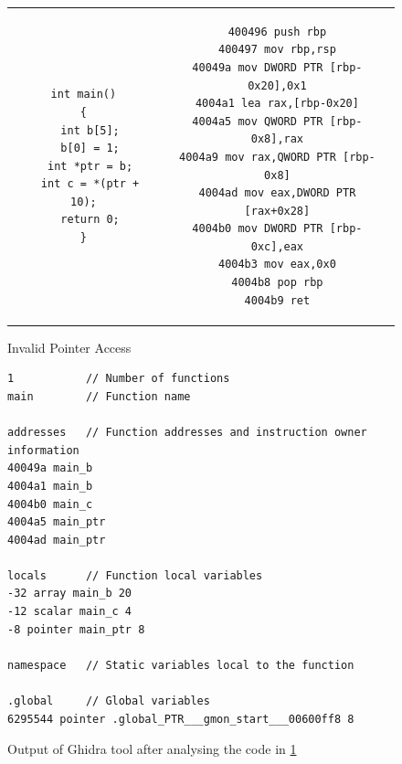 \begin{figure}
\begin{centering}
\begin{tabular}{ c | c }
\begin{lstlisting}
int main()
{
  int b[5];
  b[0] = 1;
  int *ptr = b;
  int c = *(ptr + 10);
  return 0;
}
\end{lstlisting}
&
\begin{lstlisting}
400496 push rbp
400497 mov rbp,rsp
40049a mov DWORD PTR [rbp-0x20],0x1
4004a1 lea rax,[rbp-0x20]
4004a5 mov QWORD PTR [rbp-0x8],rax
4004a9 mov rax,QWORD PTR [rbp-0x8]
4004ad mov eax,DWORD PTR [rax+0x28]
4004b0 mov DWORD PTR [rbp-0xc],eax
4004b3 mov eax,0x0
4004b8 pop rbp
4004b9 ret
\end{lstlisting}
\end{tabular}
\caption{Invalid Pointer Access\label{fig:fig32}}
\par\end{centering}
\end{figure}

\begin{figure}
\begin{centering}
\begin{lstlisting}
1           // Number of functions
main        // Function name

addresses   // Function addresses and instruction owner information
40049a main_b
4004a1 main_b
4004b0 main_c
4004a5 main_ptr
4004ad main_ptr

locals      // Function local variables
-32 array main_b 20
-12 scalar main_c 4
-8 pointer main_ptr 8

namespace   // Static variables local to the function

.global     // Global variables
6295544 pointer .global_PTR___gmon_start___00600ff8 8
\end{lstlisting}
\caption{Output of Ghidra tool after analysing the code in \cref{fig:fig32}\label{fig:fig33}}
\par\end{centering}
\end{figure}

